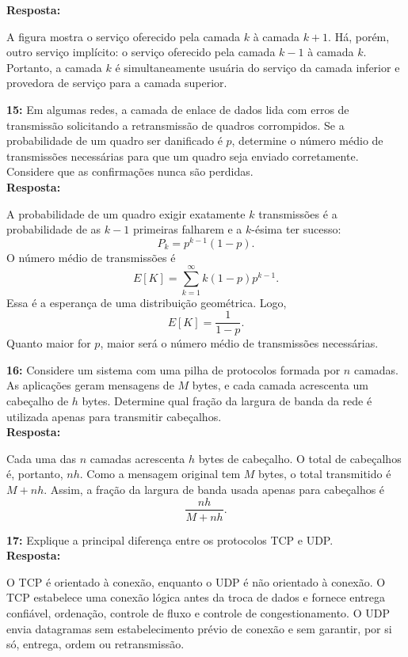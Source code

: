 \documentclass[12pt,a4paper]{report}
\begin{document}
\textbf{Resposta:}

A figura mostra o serviço oferecido pela camada \(k\) à camada \(k+1\). Há, porém, outro serviço implícito: o serviço oferecido pela camada \(k-1\) à camada \(k\). Portanto, a camada \(k\) é simultaneamente usuária do serviço da camada inferior e provedora de serviço para a camada superior.

\vspace{0.6cm}

\noindent \textbf{15:} Em algumas redes, a camada de enlace de dados lida com erros de transmissão solicitando a retransmissão de quadros corrompidos. Se a probabilidade de um quadro ser danificado é \(p\), determine o número médio de transmissões necessárias para que um quadro seja enviado corretamente. Considere que as confirmações nunca são perdidas. \\
\textbf{Resposta:}

A probabilidade de um quadro exigir exatamente \(k\) transmissões é a probabilidade de as \(k-1\) primeiras falharem e a \(k\)-ésima ter sucesso:
\[
    P_k=p^{k-1}(1-p).
\]
O número médio de transmissões é
\[
    E[K]=\sum_{k=1}^{\infty} k(1-p)p^{k-1}.
\]
Essa é a esperança de uma distribuição geométrica. Logo,
\[
    E[K]=\frac{1}{1-p}.
\]
Quanto maior for \(p\), maior será o número médio de transmissões necessárias.

\vspace{0.6cm}

\noindent \textbf{16:} Considere um sistema com uma pilha de protocolos formada por \(n\) camadas. As aplicações geram mensagens de \(M\) bytes, e cada camada acrescenta um cabeçalho de \(h\) bytes. Determine qual fração da largura de banda da rede é utilizada apenas para transmitir cabeçalhos. \\
\textbf{Resposta:}

Cada uma das \(n\) camadas acrescenta \(h\) bytes de cabeçalho. O total de cabeçalhos é, portanto, \(nh\). Como a mensagem original tem \(M\) bytes, o total transmitido é \(M+nh\). Assim, a fração da largura de banda usada apenas para cabeçalhos é
\[
    \frac{nh}{M+nh}.
\]

\vspace{0.6cm}

\noindent \textbf{17:} Explique a principal diferença entre os protocolos TCP e UDP. \\
\textbf{Resposta:}

O TCP é orientado à conexão, enquanto o UDP é não orientado à conexão. O TCP estabelece uma conexão lógica antes da troca de dados e fornece entrega confiável, ordenação, controle de fluxo e controle de congestionamento. O UDP envia datagramas sem estabelecimento prévio de conexão e sem garantir, por si só, entrega, ordem ou retransmissão.
\end{document}
